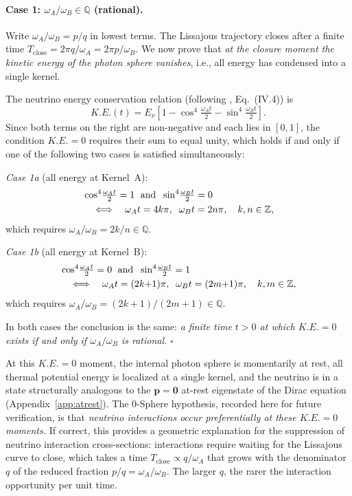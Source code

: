 \documentclass[%
 reprint, amsmath,amssymb, aps, prb, ]{revtex4-2}
\numberwithin{equation}{section}
\begin{document}
\paragraph{Case 1: $\omega_A/\omega_B \in \mathbb{Q}$ (rational).}
Write $\omega_A/\omega_B = p/q$ in lowest terms. The Lissajous trajectory closes after a finite time $T_\mathrm{close} = 2\pi q/\omega_A = 2\pi p/\omega_B$. We now prove that \emph{at the closure moment the kinetic energy of the photon sphere vanishes}, i.e., all energy has condensed into a single kernel.

The neutrino energy conservation relation (following \cite{hanamura09}, Eq.~(IV.4)) is
\begin{equation}
K.E.(t) = E_\nu\!\left[1 - \cos^4\!\tfrac{\omega_A t}{2} - \sin^4\!\tfrac{\omega_B t}{2}\right].
\label{eq:nu_KE}
\end{equation}
Since both terms on the right are non-negative and each lies in $[0,1]$, the condition $K.E. = 0$ requires their sum to equal unity, which holds if and only if one of the following two cases is satisfied simultaneously:

\textit{Case 1a} (all energy at Kernel~A):
\begin{align}
&\cos^4\!\tfrac{\omega_A t}{2} = 1 \;\text{ and }\; \sin^4\!\tfrac{\omega_B t}{2} = 0\notag\\
&\quad\Longleftrightarrow\quad
\omega_A t = 4k\pi,\;\; \omega_B t = 2n\pi,\quad k,n\in\mathbb{Z},
\label{eq:KE0_caseA}
\end{align}
which requires $\omega_A/\omega_B = 2k/n \in \mathbb{Q}$.

\textit{Case 1b} (all energy at Kernel~B):
\begin{align}
&\cos^4\!\tfrac{\omega_A t}{2} = 0 \;\text{ and }\; \sin^4\!\tfrac{\omega_B t}{2} = 1\notag\\
&\quad\Longleftrightarrow\quad
\omega_A t = (2k{+}1)\pi,\;\; \omega_B t = (2m{+}1)\pi,\quad k,m\in\mathbb{Z},
\label{eq:KE0_caseB}
\end{align}
which requires $\omega_A/\omega_B = (2k+1)/(2m+1) \in \mathbb{Q}$.

In both cases the conclusion is the same: \emph{a finite time $t > 0$ at which $K.E. = 0$ exists if and only if $\omega_A/\omega_B$ is rational.} $\square$

At this $K.E. = 0$ moment, the internal photon sphere is momentarily at rest, all thermal potential energy is localized at a single kernel, and the neutrino is in a state structurally analogous to the $\mathbf{p} = \mathbf{0}$ at-rest eigenstate of the Dirac equation (Appendix~\ref{app:atrest}). The 0-Sphere hypothesis, recorded here for future verification, is that \emph{neutrino interactions occur preferentially at these $K.E. = 0$ moments.} If correct, this provides a geometric explanation for the suppression of neutrino interaction cross-sections: interactions require waiting for the Lissajous curve to close, which takes a time $T_\mathrm{close} \propto q/\omega_A$ that grows with the denominator $q$ of the reduced fraction $p/q = \omega_A/\omega_B$. The larger $q$, the rarer the interaction opportunity per unit time.
\end{document}
